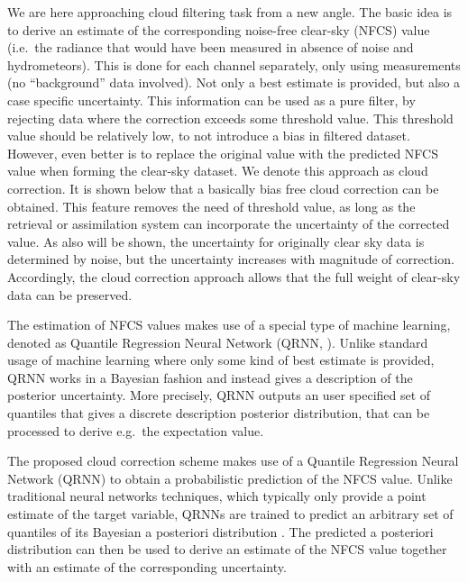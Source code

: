 \documentclass[amt, manuscript]{copernicus}
\begin{document}
We are here approaching cloud filtering task from a new angle. The basic idea
is to derive an estimate of the corresponding noise-free clear-sky (NFCS) value
(i.e.\ the radiance that would have been measured in absence of noise and
hydrometeors). This is done for each channel separately, only using
measurements (no ``background'' data involved). Not only a best estimate is
provided, but also a case specific uncertainty. This information can be used as a pure filter, by rejecting data where the correction exceeds some threshold value. This threshold value should be
relatively low, to not introduce a bias in filtered dataset. However, even
better is to replace the original value with the predicted NFCS value when
forming the clear-sky dataset. We denote this approach as cloud correction. It
is shown below that a basically bias free cloud correction can be obtained.
This feature removes the need of threshold value, as long as the retrieval or
assimilation system can incorporate the uncertainty of the corrected value. As
also will be shown, the uncertainty for originally clear sky data is determined
by noise, but the uncertainty increases with magnitude of correction.
Accordingly, the cloud correction approach allows that the full weight of
clear-sky data can be preserved.

The estimation of NFCS values makes use of a special type of machine learning,
denoted as Quantile Regression Neural Network (QRNN,
\citet{pfreundschuh:aneur:18}). Unlike standard usage of machine learning where
only some kind of best estimate is provided, QRNN works in a Bayesian fashion
and instead gives a description of the posterior uncertainty. More precisely,
QRNN outputs an user specified set of quantiles that gives a discrete
description posterior distribution, that can be processed to derive e.g.\ the
expectation value.

The proposed cloud correction scheme makes use of a Quantile Regression Neural
Network (QRNN) to obtain a probabilistic prediction of the NFCS value. Unlike
traditional neural networks techniques, which typically only provide a point
estimate of the target variable, QRNNs are trained to predict an arbitrary set
of quantiles of its Bayesian a posteriori distribution
\citep{pfreundschuh:aneur:18}. The predicted a posteriori distribution 
can then be used to derive an estimate of the NFCS value together with an estimate
of the corresponding uncertainty.
\end{document}
